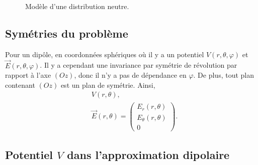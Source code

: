 \begin{figure}
    \centering
    \caption{Modèle d'une distribution neutre.}    
    \label{fig:modele_distribution_neutre}
\end{figure}

\subsection{Symétries du problème}

Pour un dipôle, en coordonnées sphériques où il y a un potentiel $V(r,\theta,\varphi)$ et $\vec{E}(r,\theta,\varphi)$. Il y a cependant une invariance par symétrie de révolution par rapport à l'axe $(Oz)$, donc il n'y a pas de dépendance en $\varphi$. De plus, tout plan contenant $(Oz)$ est un plan de symétrie. Ainsi,
\begin{equation*}
    \boxed{
        \begin{aligned}
            &V(r,\theta),\\
            &\vec{E}(r,\theta)=\begin{pmatrix}
                E_r(r,\theta)\\ E_{\theta}(r,\theta)\\0
            \end{pmatrix}.
        \end{aligned}
    }
\end{equation*}

\subsection{Potentiel \texorpdfstring{$V$}{V} dans l'approximation dipolaire}

